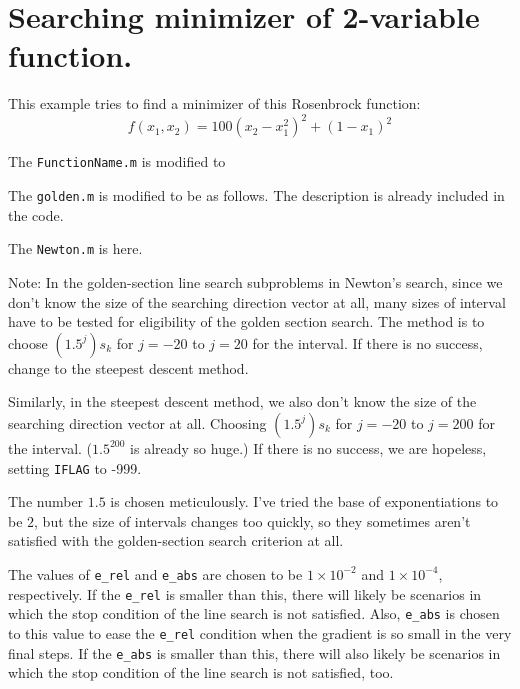\documentclass{article}
\begin{document}
\section*{Searching minimizer of 2-variable function.}

This example tries to find a minimizer of this Rosenbrock function:
$$f(x_1,x_2) = 100( x_2 - x_1^2 )^2 + ( 1 - x_1 )^2$$

The \lstinline{FunctionName.m} is modified to



The \lstinline{golden.m} is modified to be as follows. The description is already included in the code.



The \lstinline{Newton.m} is here.



Note: In the golden-section line search subproblems in Newton's search, since we don't know the size of the searching direction vector at all, many sizes of interval have to be tested for eligibility of the golden section search. The method is to choose $(1.5^j)s_k$ for $j = -20$ to $j = 20$ for the interval. If there is no success, change to the steepest descent method.

Similarly, in the steepest descent method, we also don't know the size of the searching direction vector at all. Choosing $(1.5^j)s_k$ for $j = -20$ to $j = 200$ for the interval. ($1.5^{200}$ is already so huge.) If there is no success, we are hopeless, setting \lstinline{IFLAG} to -999.

The number $1.5$ is chosen meticulously. I've tried the base of exponentiations to be $2$, but the size of intervals changes too quickly, so they sometimes aren't satisfied with the golden-section search criterion at all.

The values of \lstinline{e_rel} and \lstinline{e_abs} are chosen to be $1 \times 10^{-2}$ and $1 \times 10^{-4}$, respectively. If the \lstinline{e_rel} is smaller than this, there will likely be scenarios in which the stop condition of the line search is not satisfied. Also, \lstinline{e_abs} is chosen to this value to ease the \lstinline{e_rel} condition when the gradient is so small in the very final steps. If the \lstinline{e_abs} is smaller than this, there will also likely be scenarios in which the stop condition of the line search is not satisfied, too.
\end{document}
